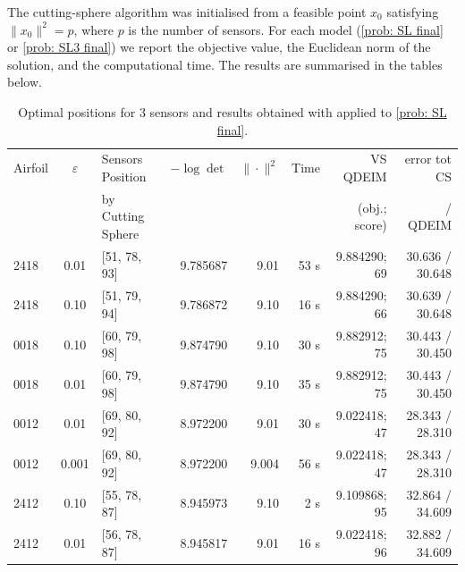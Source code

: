 \documentclass[12pt]{amsart}
\theoremstyle{plain}
\theoremstyle{definition}
\begin{document}
The cutting-sphere algorithm was initialised from a feasible point \(x_0\) satisfying \(\|x_0\|^2 = p\), where \(p\) is the number of sensors. For each model (\eqref{prob: SL final} or \eqref{prob: SL3 final}) we report the objective value, the Euclidean norm of the solution, and the computational time. The results are summarised in the tables below.

\begin{table}[htbp]
\centering
\small
\caption{Optimal positions for 3 sensors and results obtained with \cite[Algorithm 3]{bednarczuk2026outer} applied to \eqref{prob: SL final}.}
\label{tab:sensor-placement 3 logdet}
\begin{tabular}{l | c | l | r | r | r | r | r}
\hline
Airfoil & \(\varepsilon\) & Sensors Position & \(-\log\det\) & \(\|\cdot\|^2\) & Time & VS QDEIM & error tot CS \\
 &  & by Cutting Sphere &   &  &  & (obj.; score) & / QDEIM \\
\hline
2418 & 0.01 & [51, 78, 93] & 9.785687 & 9.01 & 53 s & 9.884290; 69 & 30.636 / 30.648 \\
2418 & 0.10 & [51, 79, 94] & 9.786872 & 9.10 & 16 s & 9.884290; 66 & 30.639 / 30.648 \\
0018 & 0.10 & [60, 79, 98] & 9.874790 & 9.10 & 30 s & 9.882912; 75 & 30.443 / 30.450 \\
0018 & 0.01 & [60, 79, 98] & 9.874790 & 9.10 & 35 s & 9.882912; 75 & 30.443 / 30.450 \\
0012 & 0.01 & [69, 80, 92] & 8.972200 & 9.01 & 30 s & 9.022418; 47 & 28.343 / 28.310 \\
0012 & 0.001 & [69, 80, 92] & 8.972200 & 9.004 & 56 s & 9.022418; 47 & 28.343 / 28.310 \\
2412 & 0.10 & [55, 78, 87] & 8.945973 & 9.10 & 2 s & 9.109868; 95 & 32.864 / 34.609 \\
2412 & 0.01 & [56, 78, 87] & 8.945817 & 9.01 & 16 s & 9.022418; 96 & 32.882 / 34.609 \\
\hline
\end{tabular}
\end{table}
\end{document}
